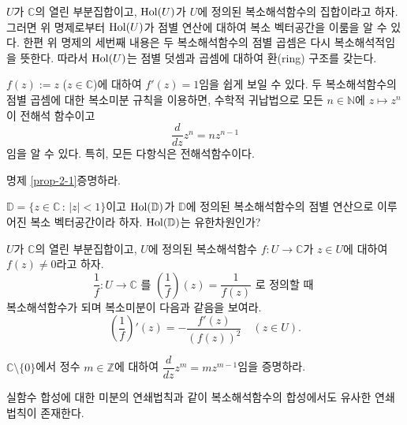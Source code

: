\begin{salt_remark}\label{remark-2-1}
$U$가 $\mathbb C$의 열린 부분집합이고,
$\mathop{\mathrm{Hol}}(U)$가 $U$에 정의된 복소해석함수의 집합이라고 하자.
그러면 위 명제로부터 $\mathop{\mathrm{Hol}}(U)$가 점별 연산에 대하여 복소 벡터공간을 이룸을 알 수 있다.
한편 위 명제의 세번째 내용은 두 복소해석함수의 점별 곱셈은 다시 복소해석적임을 뜻한다.
따라서 $\mathop{\mathrm{Hol}}(U)$는 점별 덧셈과 곱셈에 대하여
환(ring) 구조를 갖는다.
\end{salt_remark}

\begin{saltexample}[label=example-2-3]{}{}
$f(z):=z$ ($z\in \mathbb C$)에 대하여 $f'(z)=1$임을 쉽게 보일 수 있다.
두 복소해석함수의 점별 곱셈에 대한 복소미분 규칙을 이용하면,
수학적 귀납법으로 모든 $n\in \mathbb N$에 $z\mapsto z^n$이 전해석 함수이고
\[
\dfrac{d}{dz} z^n = nz^{n-1}
\]
임을 알 수 있다.
특히, 모든 다항식은 전해석함수이다.
\end{saltexample}

\begin{salt_exercise} \label{ex-2-4}
명제 \ref{prop-2-1}\을 증명하라.
\end{salt_exercise}


\begin{salt_exercise} \label{ex-2-5}
$\mathbb D = \{ z\in\mathbb C \,:\, |z|<1 \}$이고
$\mathop{\mathrm{Hol}}(\mathbb D)$가 $\mathbb D$에 정의된 복소해석함수의 점별 연산으로 이루어진
복소 벡터공간이라 하자.  $\mathop{\mathrm{Hol}}(\mathbb D)$는 유한차원인가?
\end{salt_exercise}


\begin{salt_exercise} \label{ex-2-6}
$U$가 $\mathbb C$의 열린 부분집합이고,
$U$에 정의된 복소해석함수 $f:U\to \mathbb C$가 
$z\in U$에 대하여 $f(z)\ne 0$라고 하자.
\[
\dfrac 1f : U \to \mathbb C \text{ 를 }
\left( \dfrac 1f \right) (z) = \dfrac 1{f(z)} \text{ 로 정의할 때 }
\]
복소해석함수가 되며 복소미분이 다음과 같음을 보여라.
\[
\left( \dfrac 1f \right)' (z) = - \dfrac{f'(z)}{(f(z))^2} \quad (z\in U).
\]
\end{salt_exercise}

\begin{salt_exercise} \label{ex-2-7}
$\mathbb C\setminus \{0\}$에서 정수 $m\in\mathbb Z$에 대하여
$\dfrac d{dz} z^m = mz^{m-1}$임을 증명하라.
\end{salt_exercise}

실함수 합성에 대한 미분의 연쇄법칙과 같이
복소해석함수의 합성에서도 유사한 연쇄법칙이 존재한다.


